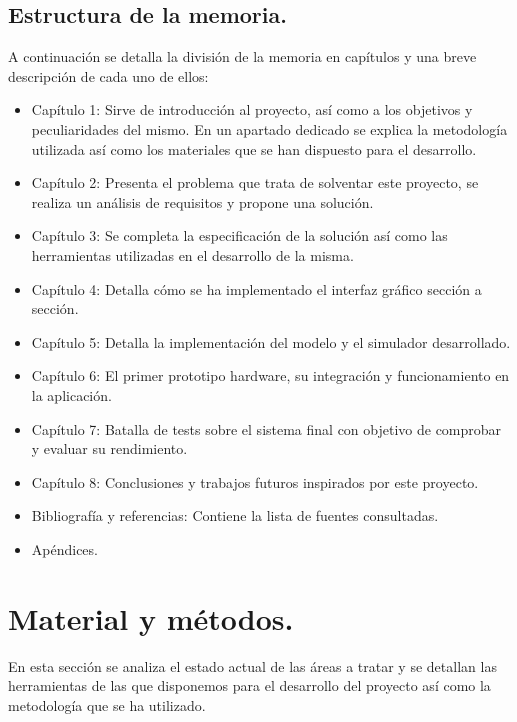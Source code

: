 \subsection{Estructura de la memoria.}
A continuación se detalla la división de la memoria en capítulos y una breve descripción de cada uno de ellos:
\begin{itemize}
  \item Capítulo 1: Sirve de introducción al proyecto, así como a los objetivos y peculiaridades del mismo. En un apartado dedicado se explica la metodología utilizada así como los materiales que se han dispuesto para el desarrollo.
  \item Capítulo 2: Presenta el problema que trata de solventar este proyecto, se realiza un análisis de requisitos y propone una solución.
  \item Capítulo 3: Se completa la especificación de la solución así como las herramientas utilizadas en el desarrollo de la misma.
  \item Capítulo 4: Detalla cómo se ha implementado el interfaz gráfico sección a sección.
  \item Capítulo 5: Detalla la implementación del modelo y el simulador desarrollado.
  \item Capítulo 6: El primer prototipo hardware, su integración y funcionamiento en la aplicación.
  \item Capítulo 7: Batalla de tests sobre el sistema final con objetivo de comprobar y evaluar su rendimiento.
  \item Capítulo 8: Conclusiones y trabajos futuros inspirados por este proyecto.
  \item Bibliografía y referencias: Contiene la lista de fuentes consultadas.
  \item Apéndices.
\end{itemize}

\section{Material y métodos.}
En esta sección se analiza el estado actual de las áreas a tratar y se detallan las herramientas de las que disponemos para el desarrollo del proyecto así como la metodología que se ha utilizado.

